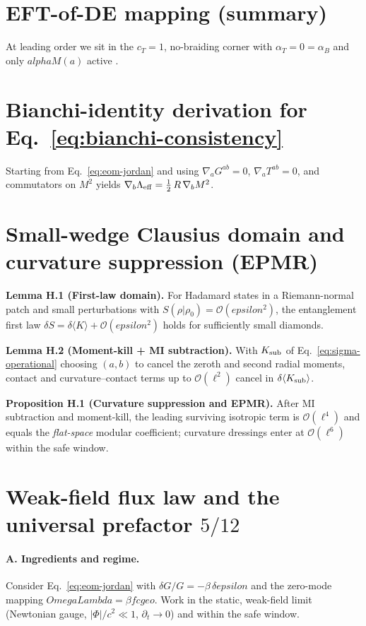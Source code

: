 \documentclass[aps,prd,onecolumn,superscriptaddress,nofootinbib]{revtex4-2}
\def\OmL{OmegaLambda}%
\def\cgeo{cgeo}%
\def\alphaM{alphaM}%
\def\eps{epsilon}%
\newcommand{\OmL}{\Omega_\Lambda}
\newcommand{\cgeo}{c_{\rm geo}}
\newcommand{\alphaM}{\alpha_M}
\newcommand{\eps}{\varepsilon}
\begin{document}
\section{EFT-of-DE mapping (summary)}
\label{app:eft}
At leading order we sit in the $c_T=1$, no-braiding corner with $\alpha_T=0=\alpha_B$ and only $\alphaM(a)$ active \cite{BelliniSawicki2014}.

\section{Bianchi-identity derivation for Eq.\ \eqref{eq:bianchi-consistency}}
\label{app:bianchi-derivation}
Starting from Eq.\ \eqref{eq:eom-jordan} and using $\nabla_a G^{ab}=0$, $\nabla_a T^{ab}=0$, and commutators on $M^2$ yields $\nabla_b \Lambda_{\rm eff} = \tfrac12\, R\,\nabla_b M^2$.

\section{Small-wedge Clausius domain and curvature suppression (EPMR)}
\label{app:epmr}
\noindent\textbf{Lemma H.1 (First-law domain).}
For Hadamard states in a Riemann-normal patch and small perturbations with $S(\rho|\rho_0)=\mathcal O(\eps^2)$, the entanglement first law
$\delta S=\delta\langle K\rangle+\mathcal O(\eps^2)$
holds for sufficiently small diamonds.

\medskip
\noindent\textbf{Lemma H.2 (Moment-kill + MI subtraction).}
With $K_{\rm sub}$ of Eq.~\eqref{eq:sigma-operational} choosing $(a,b)$ to cancel the zeroth and second radial moments, contact and curvature--contact terms up to $\mathcal O(\ell^2)$ cancel in $\delta\langle K_{\rm sub}\rangle$.

\medskip
\noindent\textbf{Proposition H.1 (Curvature suppression and EPMR).}
After MI subtraction and moment-kill, the leading surviving isotropic term is $\mathcal O(\ell^4)$ and equals the \emph{flat-space} modular coefficient; curvature dressings enter at $\mathcal O(\ell^6)$ within the safe window.

\section{Weak-field flux law and the universal prefactor \texorpdfstring{$5/12$}{5/12}}
\label{app:a0-derivation}
\paragraph*{A. Ingredients and regime.}
Consider Eq.~\eqref{eq:eom-jordan} with $\delta G/G=-\beta\,\delta\eps$ and the zero-mode mapping $\OmL=\beta f \cgeo$.
Work in the static, weak-field limit (Newtonian gauge, $|\Phi|/c^2\ll1$, $\partial_t\to 0$) and within the safe window.
\end{document}
